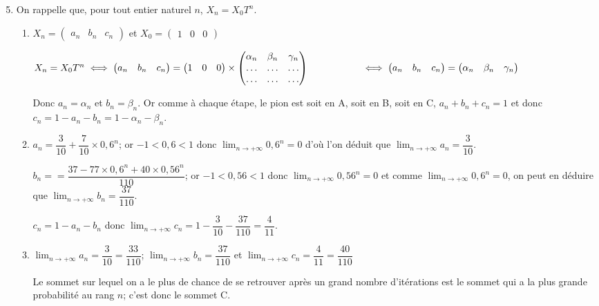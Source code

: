 \documentclass[12pt]{article}
\begin{document}
\begin{enumerate}
\setcounter{enumi}{4}
\item On rappelle que, pour tout entier naturel $n$, $X_n=X_0T^n$.

\begin{enumerate}
 \item 
 $X_n =
 \begin{pmatrix} a_n & b_n & c_n \end{pmatrix}$
 et 
$X_0 =
 \begin{pmatrix} 1 & 0 & 0 \end{pmatrix}$

$X_n=X_0T^n
\iff
 \begin{pmatrix}  a_n & b_n & c_n  \end{pmatrix}
 = 
  \begin{pmatrix} 1 & 0 & 0 \end{pmatrix}
  \times
  \begin{pmatrix} 
\alpha_n & \beta_n & \gamma_n \\
\ldots & \ldots & \ldots \\
\ldots & \ldots & \ldots 
\end{pmatrix}\\
\phantom{X_n=X_0T^n}
\iff
\begin{pmatrix}  a_n & b_n & c_n  \end{pmatrix}
 = 
\begin{pmatrix}  \alpha_n & \beta_n & \gamma_n  \end{pmatrix}
$

Donc $a_n=\alpha_n$ et $b_n=\beta_n$. Or comme à chaque étape, le pion est soit en A, soit en B, soit en C, $a_n+b_n+c_n=1$ et donc $c_n=1-a_n-b_n=1-\alpha_n-\beta_n$.

\item
$a_n=\dfrac{3}{10}+\dfrac{7}{10}\times 0,6^n$; or $-1<0,6<1$ donc 
$\displaystyle\lim_{n \to +\infty}0,6^n=0$ d'où l'on déduit que 
$\displaystyle\lim_{n \to +\infty} a_n=\dfrac{3}{10}$.

$b_n==\dfrac{37-77\times 0,6^n +40\times 0,56^n}{110}$; or $- 1 < 0,56 < 1$ donc 
$\displaystyle\lim_{n \to +\infty}0,56^n=0$ et comme 
$\displaystyle\lim_{n \to +\infty}0,6^n=0$, on peut en déduire que
$\displaystyle\lim_{n \to +\infty}b_n=\dfrac{37}{110}$.

$c_n=1-a_n-b_n$ donc $\displaystyle\lim_{n \to +\infty}c_n = 1-\dfrac{3}{10} - \dfrac{37}{110} = \dfrac{4}{11}$.

\item
$\displaystyle\lim_{n \to +\infty}a_n=\dfrac{3}{10}=\dfrac{33}{110}$;
$\displaystyle\lim_{n \to +\infty}b_n=\dfrac{37}{110}$ et
$\displaystyle\lim_{n \to +\infty}c_n=\dfrac{4}{11}=\dfrac{40}{110}$

Le sommet sur lequel on a le plus de chance de se retrouver après un grand nombre d'itérations est le sommet qui a la plus grande probabilité au rang $n$; c'est donc le sommet C.
 \end{enumerate} 

\end{enumerate}
\end{document}
